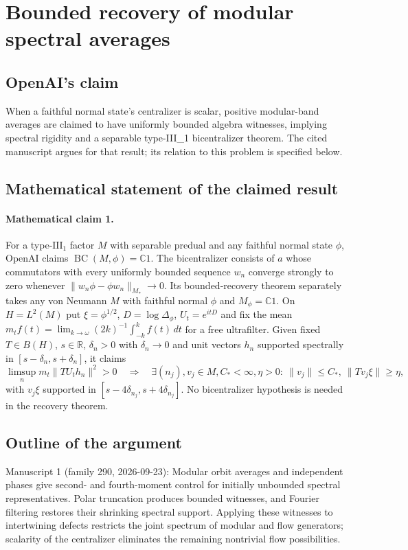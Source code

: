 \documentclass[11pt]{article}
\begin{document}
\section*{Bounded recovery of modular spectral averages}

\subsection{OpenAI's claim}
When a faithful normal state's centralizer is scalar, positive modular-band averages are claimed to have uniformly bounded algebra witnesses, implying spectral rigidity and a separable type-III\_1 bicentralizer theorem. The cited manuscript argues for that result; its relation to this problem is specified below.

\subsection{Mathematical statement of the claimed result}
\paragraph{Mathematical claim 1.} For a type-$\mathrm{III}_1$ factor $M$ with separable predual and any faithful normal state $\phi$, OpenAI claims $\operatorname{BC}(M,\phi)=\mathbb C1$. The bicentralizer consists of $a$ whose commutators with every uniformly bounded sequence $w_n$ converge strongly to zero whenever $\|w_n\phi-\phi w_n\|_{M_*}\to0$.
Its bounded-recovery theorem separately takes any von Neumann $M$ with faithful normal $\phi$ and $M_\phi=\mathbb C1$. On $H=L^2(M)$ put $\xi=\phi^{1/2}$, $D=\log\Delta_\phi$, $U_t=e^{itD}$ and fix the mean $m_tf(t)=\lim_{k\to\omega}(2k)^{-1}\int_{-k}^kf(t)\,dt$ for a free ultrafilter. Given fixed $T\in B(H)$, $s\in\mathbb R$, $\delta_n>0$ with $\delta_n\to0$ and unit vectors $h_n$ supported spectrally in $[s-\delta_n,s+\delta_n]$, it claims
\[
\limsup_nm_t\|TU_th_n\|^2>0
\quad\Longrightarrow\quad
\exists(n_j),v_j\in M,C_*<\infty,\eta>0:\ \|v_j\|\le C_*,\ \|Tv_j\xi\|\ge\eta,
\]
with $v_j\xi$ supported in $[s-4\delta_{n_j},s+4\delta_{n_j}]$. No bicentralizer hypothesis is needed in the recovery theorem.

\subsection{Outline of the argument}
Manuscript 1 (family 290, 2026-09-23): Modular orbit averages and independent phases give second- and fourth-moment control for initially unbounded spectral representatives. Polar truncation produces bounded witnesses, and Fourier filtering restores their shrinking spectral support. Applying these witnesses to intertwining defects restricts the joint spectrum of modular and flow generators; scalarity of the centralizer eliminates the remaining nontrivial flow possibilities.
\end{document}
